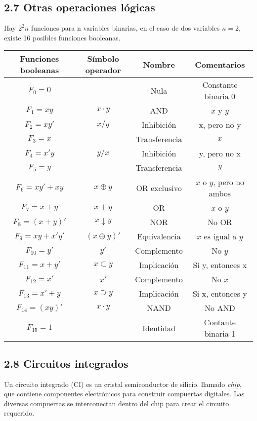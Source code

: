 \documentclass{article}
\begin{document}
\subsection*{2.7 Otras operaciones l\'{o}gicas}
Hay $2^2n$ funciones para n variables binarias, en el caso de dos variables $n = 2$, existe 16 posibles funciones booleanas.

\begin{table}[h]
    \centering
    \begin{tabular}{cccc}
        \toprule
        Funciones booleanas & S\'{i}mbolo operador & Nombre & Comentarios \\ 
        \midrule
        $F_0 = 0$ & & Nula & Constante binaria 0 \\
        $F_1 = xy$ & $x \cdot y$ & AND &$x$ y $y$ \\ 
        $F_2 = xy'$ & $x/y$ & Inhibici\'{o}n & x, pero no y \\
        $F_3 = x$ & & Transferencia & $x$ \\
        $F_4 = x'y$ & $y/x$ & Inhibici\'{o}n & y, pero no x \\
        $F_5 = y$ & & Transferencia & $y$ \\
        $F_6 = xy' + xy$ & $x \oplus y$ & OR exclusivo & $x$ o $y$, pero no ambos \\
        $F_7 = x + y$ & $x + y$ & OR & $x$ o $y$ \\
        $F_8 = (x + y)'$ & $x \downarrow y$ & NOR & No OR \\
        $F_9 = xy + x'y'$ & $(x \oplus y)'$ & Equivalencia & $x$ es igual a $y$ \\
        $F_{10} = y'$ & $y'$ & Complemento & No $y$ \\
        $F_{11} = x + y'$ & $x \subset y$ & Implicaci\'{o}n & Si y, entonces x \\
        $F_{12} = x'$ & $x'$ & Complemento & No $x$ \\
        $F_{13} = x' + y$ & $x \supset y$ & Implicaci\'{o}n & Si x, entonces y \\
        $F_{14} = (xy)'$ & $x \cdot y$ & NAND & No AND \\
        $F_{15} = 1$ & & Identidad & Contante binaria 1 \\
        \bottomrule
    \end{tabular}
\end{table}
\newpage

\subsection*{2.8 Circuitos integrados}
Un circuito integrado (CI) es un cristal semiconductor de silicio. llamado \textit{chip},
que contiene componentes electr\'{o}nicos para construir compuertas digitales. Las diversas
compuertas se interconectan dentro del chip para crear el circuito requerido.
\end{document}
